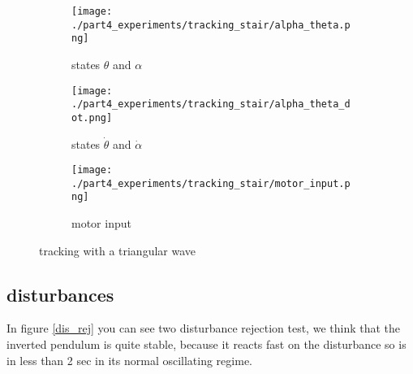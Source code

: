 
	\begin{figure}[H]
		\centering
		\begin{subfigure}[b]{0.4\textwidth}
			\texttt{[image: ./part4\_experiments/tracking\_stair/alpha\_theta.png]}
			\caption{states $\theta$ and $\alpha$}
		\end{subfigure}
		\begin{subfigure}[b]{0.4\textwidth}
			\texttt{[image: ./part4\_experiments/tracking\_stair/alpha\_theta\_dot.png]}
			\caption{states $\dot{\theta}$ and $\dot{\alpha}$}
		\end{subfigure}
		\begin{subfigure}[b]{0.4\textwidth}
			\texttt{[image: ./part4\_experiments/tracking\_stair/motor\_input.png]}
			\caption{motor input}
		\end{subfigure}
		\caption{tracking with a triangular wave}
		\label{driehoeksgolf}
	\end{figure}
	
\newpage
\subsection{disturbances}
In figure \ref{dis_rej} you can see two disturbance rejection test, we think that the inverted pendulum is quite stable, because it reacts fast on the disturbance so is in less than 2 sec in its normal oscillating regime.


